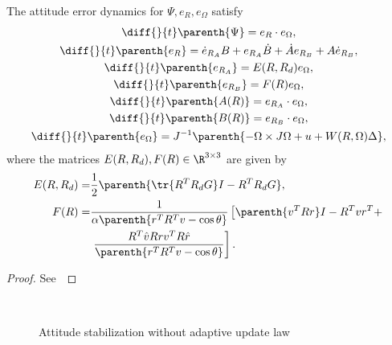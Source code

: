 \begin{prop}\label{prop:error_dyn}
	The attitude error dynamics for \( \Psi, e_R, e_\Omega \) satisfy 
	\begin{gather}
		\diff{}{t} \parenth{\Psi} = e_R \cdot e_\Omega , \label{eqn:psi_dot}\\
		\diff{}{t} \parenth{e_R} = \dot{e}_{R_A} B + e_{R_A} \dot{B} + \dot{A}e_{R_B} + A \dot{e}_{R_B} , \label{eqn:eR_dot} \\
		\diff{}{t} \parenth{e_{R_A}} = E(R, R_d) e_\Omega , \label{eqn:eRA_dot} \\
		\diff{}{t} \parenth{e_{R_B}} = F(R) e_\Omega , \label{eqn:eRB_dot} \\
    	\diff{}{t} \parenth{A(R)} = e_{R_A} \cdot e_\Omega , \label{eqn:A_dot} \\
		\diff{}{t} \parenth{B(R)} = e_{R_B} \cdot e_\Omega , \label{eqn:B_dot} \\
		\diff{}{t} \parenth{e_\Omega} = J^{-1} \parenth{-\Omega \times J \Omega + u + W(R, \Omega) \Delta} , \label{eqn:eW_dot}
	\end{gather}
	where the matrices \(E(R,R_d), F(R) \in \R^{3\times3} \) are given by
	\begin{align}
		E(R,R_d) = &\frac{1}{2} \parenth{\tr{R^T R_d G}I - R^T R_d G} , \label{eqn:E} \\
		F(R) = &\frac{1}{\alpha \parenth{r^T R^T v - \cos \theta}} \left[\parenth{v^T R r} I - R^T v r^T + \right. \nonumber \\
		& \left. \frac{R^T \hat{v} R r v^T R \hat{r}}{\parenth{r^T R^T v - \cos \theta}}\right] . \label{eqn:F}
	\end{align}
\end{prop}
\begin{proof}
See~
\end{proof}

\begin{figure}[t]
    \centering 
    ~
    ~
   ~
    \caption{Attitude stabilization without adaptive update law}
    \label{fig:con} 
\end{figure}
